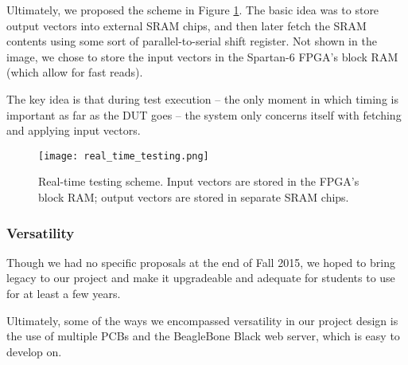 Ultimately, we proposed the scheme in Figure \ref{fig:real_time_testing}. The basic idea was to store output vectors into external SRAM chips, and then later fetch the SRAM contents using some sort of parallel-to-serial shift register. Not shown in the image, we chose to store the input vectors in the Spartan-6 FPGA's block RAM (which allow for fast reads).

The key idea is that during test execution -- the only moment in which timing is important as far as the DUT goes -- the system only concerns itself with fetching and applying input vectors. 

\begin{figure}
\texttt{[image: real\_time\_testing.png]}
\caption{Real-time testing scheme. Input vectors are stored in the FPGA's block RAM; output vectors are stored in separate SRAM chips.}
\label{fig:real_time_testing}
\end{figure}

\subsubsection{Versatility}
Though we had no specific proposals at the end of Fall 2015, we hoped to bring legacy to our project and make it upgradeable and adequate for students to use for at least a few years.

Ultimately, some of the ways we encompassed versatility in our project design is the use of multiple PCBs and the BeagleBone Black web server, which is easy to develop on.

\newpage